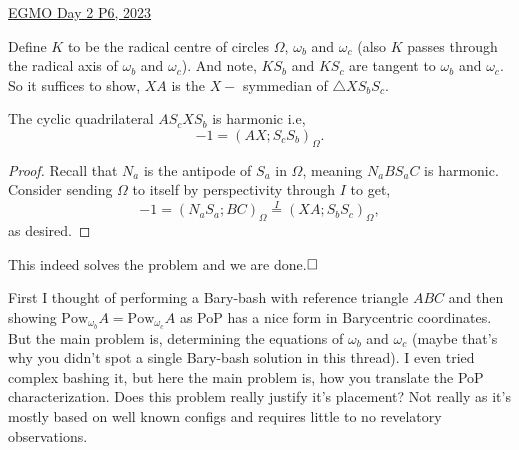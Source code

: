 \begin{problem}{1}{\href{https://artofproblemsolving.com/community/c6h3054399p27522960}{EGMO Day 2 P6, 2023}}
\begin{solution}
	Define $K$ to be the radical centre of circles $\Omega$, $\omega_b$ and $\omega_c$ (also $K$ passes through the radical axis of $\omega_b$ and $\omega_c$). And note, $KS_b$ and $KS_c$ are tangent to $\omega_b$ and $\omega_c$. So it suffices to show, $XA$ is the $X-$ symmedian of $\triangle XS_bS_c$.
	\begin{claim}
		The cyclic quadrilateral $AS_cXS_b$ is harmonic i.e,
		$$-1=(AX;S_cS_b)_{\Omega}.$$
	\end{claim}
	\begin{proof} Recall that $N_a$ is the antipode of $S_a$ in $\Omega$, meaning $N_aBS_aC$ is harmonic. Consider sending $\Omega$ to itself by perspectivity through $I$ to get,
	$$-1=(N_aS_a;BC)_{\Omega}\overset{I}{=}(XA;S_bS_c)_{\Omega},$$
	as desired.
	\end{proof}

	\noindent This indeed solves the problem and we are done.$\qedwhite$
	\begin{remark}[title=Comment.$\hspace{1mm}$]
	First I thought of performing a Bary-bash with reference triangle $ABC$ and then showing $\text{Pow}_{\omega_b}A=\text{Pow}_{\omega_c}A$ as PoP has a nice form in Barycentric coordinates. But the main problem is, determining the equations of $\omega_b$ and $\omega_c$ (maybe that's why you didn't spot a single Bary-bash solution in this thread). I even tried complex bashing it, but here the main problem is, how you translate the PoP characterization.
Does this problem really justify it's placement? Not really as it's mostly based on well known configs and requires little to no revelatory observations.
	\end{remark}
	\end{solution}
	\end{problem}

